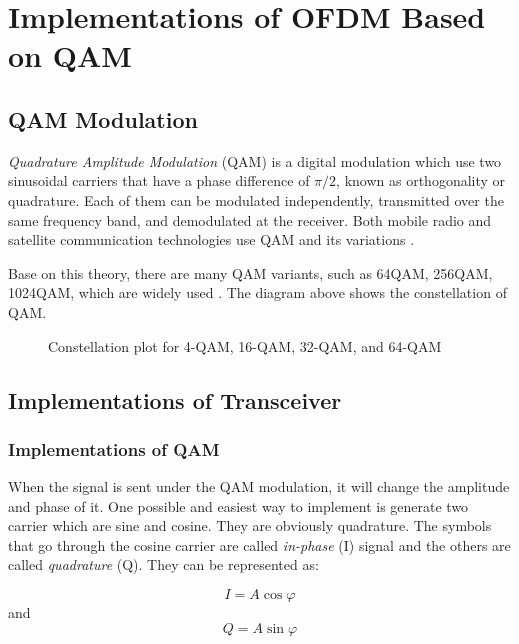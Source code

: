 \documentclass{article}
\numberwithin{figure}{section}
\numberwithin{equation}{section}
\begin{document}
\section{Implementations of OFDM Based on QAM}

\subsection{QAM Modulation}
\textit{Quadrature Amplitude Modulation} (QAM) is a digital modulation which use two sinusoidal carriers that have a phase difference of $\pi/2$, known as orthogonality or quadrature. Each of them can be modulated independently, transmitted over the same frequency band, and demodulated at the receiver. Both mobile radio and satellite communication technologies use QAM and its variations \cite{RN77}.

Base on this theory, there are many QAM variants, such as 64QAM, 256QAM, 1024QAM, which are widely used \cite{RN77}. The diagram above shows the constellation of QAM.

\begin{figure}[!h]
    \centering
    
    \caption{Constellation plot for 4-QAM, 16-QAM, 32-QAM, and 64-QAM}
    \label{fig:Constellation of QAM}
\end{figure}

\subsection{Implementations of Transceiver}
\subsubsection{Implementations of QAM}
When the signal is sent under the QAM modulation, it will change the amplitude and phase of it. One possible and easiest way to implement is generate two carrier which are sine and cosine. They are obviously quadrature. The symbols that go through the cosine carrier are called \textit{in-phase} (I) signal and the others are called \textit{quadrature} (Q). They can be represented as: 

\begin{equation}
I = A\cos{\varphi} \label{con:i signal}
\end{equation}
and
\begin{equation}
Q = A\sin{\varphi} \label{con:q signal}
\end{equation}
\end{document}
